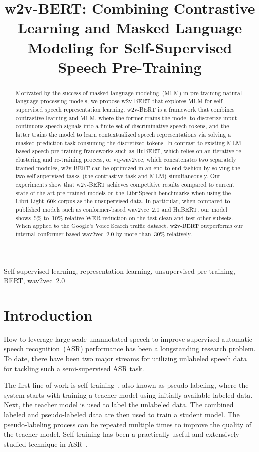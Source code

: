 \documentclass{article}
\title{w2v-BERT: Combining Contrastive Learning and Masked Language Modeling for Self-Supervised Speech Pre-Training}
\begin{document}
\ninept
%
\maketitle
%
\begin{abstract}
Motivated by the success of masked language modeling~(MLM) in pre-training natural language processing models, we propose w2v-BERT that explores MLM for self-supervised speech representation learning.
w2v-BERT is a framework that combines contrastive learning and MLM, where the former trains the model to discretize input continuous speech signals into a finite set of discriminative speech tokens, and the latter trains the model to learn contextualized speech representations via solving a masked prediction task consuming the discretized tokens.
In contrast to existing MLM-based speech pre-training frameworks such as HuBERT, which relies on an iterative re-clustering and re-training process, or vq-wav2vec, which concatenates two separately trained modules, w2v-BERT can be optimized in an end-to-end fashion by solving the two self-supervised tasks~(the contrastive task and MLM) simultaneously.
Our experiments show that w2v-BERT achieves competitive results compared to current state-of-the-art pre-trained models on the LibriSpeech benchmarks when using the Libri-Light~60k corpus as the unsupervised data.
In particular, when compared to published models such as conformer-based wav2vec~2.0 and HuBERT, our model shows~5\% to~10\% relative WER reduction on the test-clean and test-other subsets.
When applied to the Google's Voice Search traffic dataset, w2v-BERT outperforms our internal conformer-based wav2vec~2.0 by more than~30\% relatively.
\end{abstract}
%
\begin{keywords}
Self-supervised learning, representation learning, unsupervised pre-training, BERT, wav2vec~2.0
\end{keywords}
%

\section{Introduction}
\label{sec:intro}
How to leverage large-scale unannotated speech to improve supervised automatic speech recognition~(ASR) performance has been a longstanding research problem.
To date, there have been two major streams for utilizing unlabeled speech data for tackling such a semi-supervised ASR task.

The first line of work is self-training~\cite{riloff2003learning,yarowsky1995unsupervised,scudder1965probability}, also known as pseudo-labeling, where the system starts with training a teacher model using initially available labeled data.
Next, the teacher model is used to label the unlabeled data.
The combined labeled and pseudo-labeled data are then used to train a student model.
The pseudo-labeling process can be repeated multiple times to improve the quality of the teacher model.
Self-training has been a practically useful and extensively studied technique in ASR~\cite{kahn2020self,synnaeve2020end,li2019semi,parthasarathi2019lessons,novotney2009analysis,zavaliagkos1998utilizing}.
\end{document}
